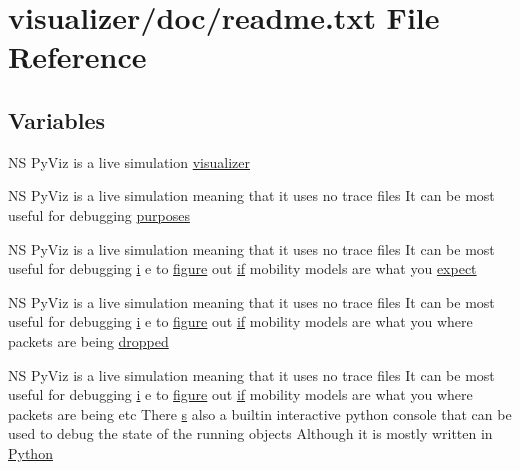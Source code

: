 \hypertarget{doc_2readme_8txt}{}\section{visualizer/doc/readme.txt File Reference}
\label{doc_2readme_8txt}
\subsection*{Variables}
\begin{DoxyCompactItemize}
\item 
NS Py\+Viz is a live simulation \hyperlink{doc_2readme_8txt_a4434c32db43d9f36afb6a7a88be7f1d8}{visualizer}
\item 
NS Py\+Viz is a live simulation meaning that it uses no trace files It can be most useful for debugging \hyperlink{doc_2readme_8txt_a4c5e4286887f08a5384019de28036aaa}{purposes}
\item 
NS Py\+Viz is a live simulation meaning that it uses no trace files It can be most useful for debugging \hyperlink{lte__uplink__power__control_8m_a6f6ccfcf58b31cb6412107d9d5281426}{i} e to \hyperlink{lte__ue__measurements_8m_a2332b9a4a4d6e4088c425e05a13e10f7}{figure} out \hyperlink{loss__OH__large__cities__urban_8m_ac77b6cfa3068152087725fe54b4ae8c8}{if} mobility models are what you \hyperlink{doc_2readme_8txt_a11460adc33d00ccf94a559cdd45990ea}{expect}
\item 
NS Py\+Viz is a live simulation meaning that it uses no trace files It can be most useful for debugging \hyperlink{lte__uplink__power__control_8m_a6f6ccfcf58b31cb6412107d9d5281426}{i} e to \hyperlink{lte__ue__measurements_8m_a2332b9a4a4d6e4088c425e05a13e10f7}{figure} out \hyperlink{loss__OH__large__cities__urban_8m_ac77b6cfa3068152087725fe54b4ae8c8}{if} mobility models are what you where packets are being \hyperlink{doc_2readme_8txt_a78ec4502c469ce77ac5c1638424d0fc8}{dropped}
\item 
NS Py\+Viz is a live simulation meaning that it uses no trace files It can be most useful for debugging \hyperlink{lte__uplink__power__control_8m_a6f6ccfcf58b31cb6412107d9d5281426}{i} e to \hyperlink{lte__ue__measurements_8m_a2332b9a4a4d6e4088c425e05a13e10f7}{figure} out \hyperlink{loss__OH__large__cities__urban_8m_ac77b6cfa3068152087725fe54b4ae8c8}{if} mobility models are what you where packets are being etc There \hyperlink{generate__test__data__lte__sinr_8m_ad83eeb3a142285d1243a08c6b7026df8}{s} also a builtin interactive python console that can be used to debug the state of the running objects Although it is mostly written in \hyperlink{doc_2readme_8txt_a5f34ac27f170e8e75dec4f484d4c44a3}{Python}

\end{DoxyCompactItemize}
